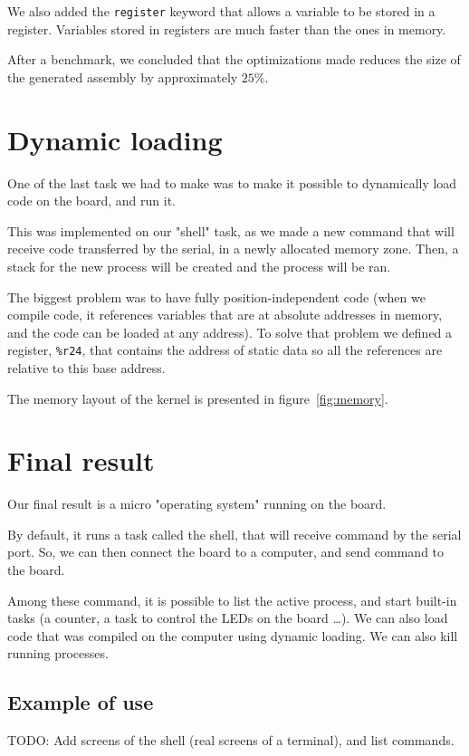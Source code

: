 \documentclass[openany, a4paper]{book}
\begin{document}
      We also added the \verb+register+ keyword that allows a variable to
      be stored in a register. Variables stored in registers are much faster
      than the ones in memory.

      After a benchmark, we concluded that the optimizations made reduces the
      size of the generated assembly by approximately $25\%$.

    \section{Dynamic loading}
      One of the last task we had to make was to make it possible to
      dynamically load code on the board, and run it.

      This was implemented on our "shell" task, as we made a new command that
      will receive code transferred by the serial, in a newly allocated
      memory zone.  Then, a stack for the new process will be created and the
      process will be ran.

      The biggest problem was to have fully position-independent code (when
      we compile code, it references variables that are at absolute addresses
      in memory, and the code can be loaded at any address). To solve that
      problem we defined a register, \verb+%r24+, that contains the address of
      static data so all the references are relative to this base address.

      The memory layout of the kernel is presented in figure~\ref{fig:memory}.

    \section{Final result}
      Our final result is a micro "operating system" running on the board.

      By default, it runs a task called the shell, that will receive command by
      the serial port.  So, we can then connect the board to a computer, and
      send command to the board.

      Among these command, it is possible to list the active process, and start
      built-in tasks (a counter, a task to control the LEDs on the board \dots).
      We can also load code that was compiled on the computer using dynamic
      loading. We can also kill running processes.

      \subsection{Example of use}
        TODO: Add screens of the shell (real screens of a terminal), and list
        commands.
\end{document}
